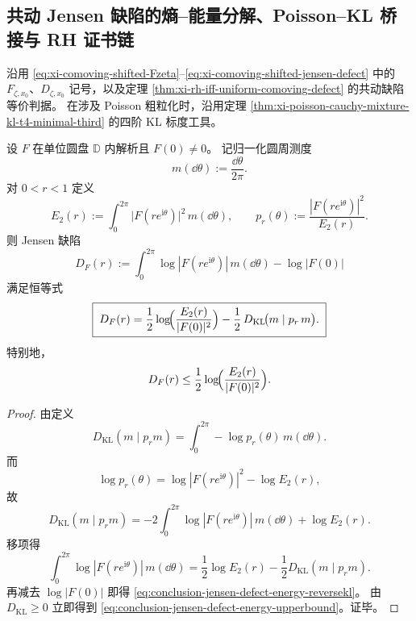 \subsection{共动 Jensen 缺陷的熵--能量分解、Poisson--KL 桥接与 RH 证书链}\label{subsec:conclusion-comoving-jensen-entropy-energy-poisson-kl-rh}
沿用
\eqref{eq:xi-comoving-shifted-Fzeta}--\eqref{eq:xi-comoving-shifted-jensen-defect}
中的 \(F_{\zeta,x_0}\)、\(D_{\zeta,x_0}\) 记号，以及定理 \ref{thm:xi-rh-iff-uniform-comoving-defect} 的共动缺陷等价判据。
在涉及 Poisson 粗粒化时，沿用定理 \ref{thm:xi-poisson-cauchy-mixture-kl-t4-minimal-third} 的四阶 KL 标度工具。

\begin{theorem}\label{thm:conclusion-jensen-defect-energy-reversekl-identity}
设 \(F\) 在单位圆盘 \(\mathbb D\) 内解析且 \(F(0)\neq 0\)。
记归一化圆周测度
\[
m(\dd\theta):=\frac{\dd\theta}{2\pi}.
\]
对 \(0<r<1\) 定义
\[
E_2(r):=\int_0^{2\pi}\bigl|F(re^{\mathrm{i}\theta})\bigr|^2\,m(\dd\theta),
\qquad
p_r(\theta):=\frac{|F(re^{\mathrm{i}\theta})|^2}{E_2(r)}.
\]
则 Jensen 缺陷
\[
D_F(r):=\int_0^{2\pi}\log|F(re^{\mathrm{i}\theta})|\,m(\dd\theta)-\log|F(0)|
\]
满足恒等式
\begin{equation}\label{eq:conclusion-jensen-defect-energy-reversekl}
\boxed{\;
D_F(r)
=\frac12\log\!\Bigl(\frac{E_2(r)}{|F(0)|^2}\Bigr)
-\frac12\,D_{\mathrm{KL}}\!\bigl(m\mid p_r\,m\bigr).\;}
\end{equation}
特别地，
\begin{equation}\label{eq:conclusion-jensen-defect-energy-upperbound}
D_F(r)\le \frac12\log\!\Bigl(\frac{E_2(r)}{|F(0)|^2}\Bigr).
\end{equation}
\end{theorem}
\begin{proof}
由定义
\[
D_{\mathrm{KL}}(m\mid p_r m)=\int_0^{2\pi}-\log p_r(\theta)\,m(\dd\theta).
\]
而
\[
\log p_r(\theta)=\log|F(re^{\mathrm{i}\theta})|^2-\log E_2(r),
\]
故
\[
D_{\mathrm{KL}}(m\mid p_r m)
=-2\int_0^{2\pi}\log|F(re^{\mathrm{i}\theta})|\,m(\dd\theta)+\log E_2(r).
\]
移项得
\[
\int_0^{2\pi}\log|F(re^{\mathrm{i}\theta})|\,m(\dd\theta)
=\frac12\log E_2(r)-\frac12D_{\mathrm{KL}}(m\mid p_r m).
\]
再减去 \(\log|F(0)|\) 即得 \eqref{eq:conclusion-jensen-defect-energy-reversekl}。
由 \(D_{\mathrm{KL}}\ge 0\) 立即得到 \eqref{eq:conclusion-jensen-defect-energy-upperbound}。证毕。
\end{proof}

